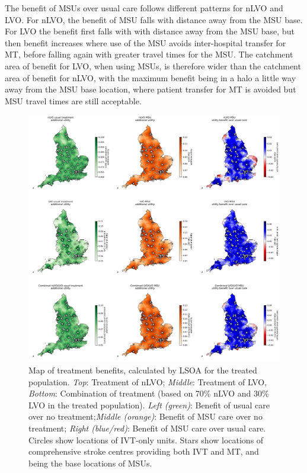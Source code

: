 The benefit of MSUs over usual care follows different patterns for nLVO and LVO. For nLVO, the benefit of MSU falls with distance away from the MSU base. For LVO the benefit first falls with with distance away from the MSU base, but then benefit increases where use of the MSU avoids inter-hospital transfer for MT, before falling again with greater travel times for the MSU. The catchment area of benefit for LVO, when using MSUs, is therefore wider than the catchment area of benefit for nLVO, with the maximum benefit being in a halo a little way away from the MSU base location, where patient transfer for MT is avoided but MSU travel times are still acceptable.


\begin{figure}[h!]
    \centering
    \includegraphics[width=1\linewidth]{images/map_utility.jpg}
    \caption{Map of treatment benefits, calculated by LSOA for the treated population. \textit{Top}: Treatment of nLVO; \textit{Middle}: Treatment of LVO, \textit{Bottom}: Combination of treatment (based on 70\% nLVO and 30\% LVO in the treated population). \textit{Left (green)}: Benefit of usual care over no treatment;\textit{Middle (orange)}: Benefit of MSU care over no treatment; \textit{Right (blue/red)}: Benefit of MSU care over usual care. Circles show locations of IVT-only units. Stars show locations of comprehensive stroke centres providing both IVT and MT, and being the base locations of MSUs.}
    \label{fig:msu_map_utility}
\end{figure}

